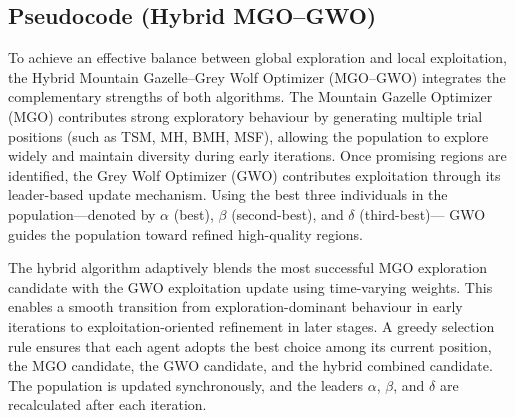 \documentclass[12pt,a4paper]{article}
\begin{document}
\subsection{Pseudocode (Hybrid MGO--GWO)}

To achieve an effective balance between global exploration and local exploitation, 
the Hybrid Mountain Gazelle--Grey Wolf Optimizer (MGO--GWO) integrates the complementary 
strengths of both algorithms. The Mountain Gazelle Optimizer (MGO) contributes strong 
exploratory behaviour by generating multiple trial positions (such as TSM, MH, BMH, MSF), 
allowing the population to explore widely and maintain diversity during early iterations. 
Once promising regions are identified, the Grey Wolf Optimizer (GWO) contributes 
exploitation through its leader-based update mechanism. Using the best three individuals 
in the population---denoted by $\alpha$ (best), $\beta$ (second-best), and $\delta$ (third-best)--- 
GWO guides the population toward refined high-quality regions.

The hybrid algorithm adaptively blends the most successful MGO exploration candidate with the 
GWO exploitation update using time-varying weights. This enables a smooth transition from 
exploration-dominant behaviour in early iterations to exploitation-oriented refinement in 
later stages. A greedy selection rule ensures that each agent adopts the best choice among 
its current position, the MGO candidate, the GWO candidate, and the hybrid combined candidate. 
The population is updated synchronously, and the leaders $\alpha$, $\beta$, and $\delta$ 
are recalculated after each iteration.
\end{document}
